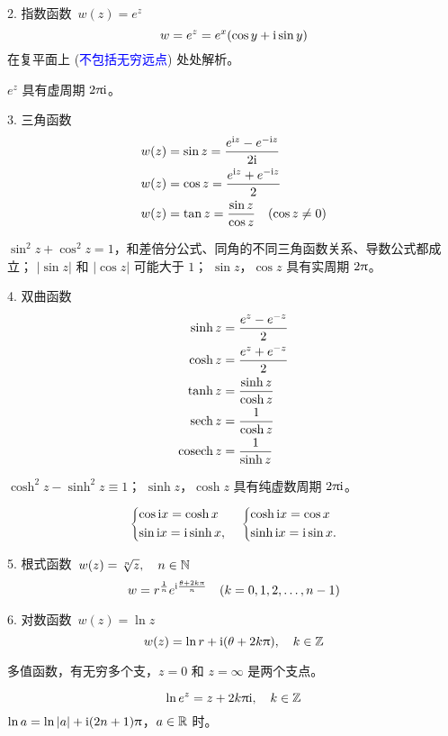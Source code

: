 \documentclass[12pt, a4paper, oneside, UTF8]{ctexbook}
\begin{document}
2. 指数函数\quad\  $w(z)=e^z$
\[w=e^z=e^x(\cos y+\mathrm{i}\sin y)\]
在复平面上 (\textcolor{blue}{不包括无穷远点}) 处处解析。
\begin{rmk}{}
    $e^z$ 具有虚周期 $2\uppi \mathrm{i}$。
\end{rmk}

3. 三角函数
\begin{align*}
    w(z) &= \sin z =\frac{e^{\mathrm{i} z}-e^{-\mathrm{i} z}}{2\mathrm{i}}\\
    w(z) &= \cos z =\frac{e^{\mathrm{i} z}+e^{-\mathrm{i} z}}{2}\\
    w(z) &= \tan z =\frac{\sin z}{\cos z}\quad (\cos z\neq 0)
\end{align*}
\begin{rmk}{}
     $\sin^2 z+\cos^2 z=1$，和差倍分公式、同角的不同三角函数关系、导数公式都成立；
     $\left\lvert \sin z\right\rvert$ 和 $\left\lvert \cos z\right\rvert$ 可能大于 $1$；
     $\sin z$，$\cos z$ 具有实周期 $2\uppi$。
\end{rmk}

4. 双曲函数
\begin{align*}
    \sinh z & = \frac{e^{z}-e^{-z}}{2}\\
    \cosh z & = \frac{e^{z}+e^{-z}}{2}\\
    \tanh z & = \frac{\sinh z}{\cosh z}\\
    \mathrm{sech}\, z & = \frac{1}{\cosh z}\\
    \mathrm{cosech}\, z & = \frac{1}{\sinh z}
\end{align*}
\begin{rmk}{}
     $\cosh^2 z - \sinh^2 z \equiv 1$；
     $\sinh z$，$\cosh z$ 具有纯虚数周期 $2\uppi\mathrm{i}$。
\end{rmk}
\begin{equation*}
    \left\{ 
    \begin{lgathered} 
        \cos \mi x=\cosh x\\
        \sin \mi x=\mi \sinh x,
    \end{lgathered}   
    \right.\quad
    \left\{ 
    \begin{lgathered} 
        \cosh \mi x=\cos x\\
        \sinh \mi x=\mi \sin x.
    \end{lgathered}   
    \right.
\end{equation*}

5. 根式函数\quad\  $w(z)=\sqrt[n]{z},\quad n\in \mathbb{N}$
\[w=r^{\frac{1}{n}}e^{\mathrm{i}\frac{\theta+2k\uppi}{n}}\quad (k=0,1,2,\dots,n-1)\]

6. 对数函数\quad\  $w(z)=\ln{z}$
\[w(z)=\ln r +\mathrm{i} (\theta +2k\uppi),\quad k\in \mathbb{Z} \]
\begin{rmk}{}
    多值函数，有无穷多个支，$z=0$ 和 $z=\infty$ 是两个支点。
\end{rmk}
\[\ln e^z=z+2k\uppi\mathrm{i},\quad k\in \mathbb{Z}\]
 $\ln a=\ln \left\lvert a\right\rvert +\mathrm{i} (2n+1)\uppi$，$a\in \mathbb{R}$ 时。
\end{document}
